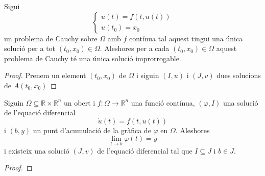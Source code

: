 \documentclass[../Apunts.tex]{subfiles}
\begin{document}
	\begin{proposition}
		\label{prop:la solució improrrogable és única}
		Sigui
		\[\begin{cases}
			\displaystyle \dot{u}(t)=f(t,u(t)) \\
			\displaystyle u(t_{0})=x_{0}
		\end{cases}\]
		un problema de Cauchy sobre \(\Omega\) amb \(f\) contínua tal aquest tingui una única solució per a tot \((t_{0},x_{0})\in\Omega\). Aleshores per a cada \((t_{0},x_{0})\in\Omega\) aquest problema de Cauchy té una única solució improrrogable.
		\begin{proof}
			Prenem un element \((t_{0},x_{0})\) de \(\Omega\) i siguin \((I,u)\) i \((J,v)\) dues solucions de \(A(t_{0},x_{0})\)
		\end{proof}
	\end{proposition}
	\begin{theorem}
		\label{thm:Lema de Wintner}
		Siguin \(\Omega\subseteq\mathbb{R}\times\mathbb{R}^{n}\) un obert i \(f\colon\Omega\longrightarrow\mathbb{R}^{n}\) una funció contínua, \((\varphi,I)\) una solució de l'equació diferencial
		\[\dot{u}(t)=f(t,u(t))\]
		i \((b,y)\) un punt d'acumulació de la gràfica de \(\varphi\) en \(\Omega\). Aleshores
		\[\lim_{t\to b}\varphi(t)=y\]
		i existeix una solució \((J,v)\) de l'equació diferencial tal que \(I\subseteq J\) i \(b\in J\).
		\begin{proof}
		\end{proof}
	\end{theorem}
\end{document}
